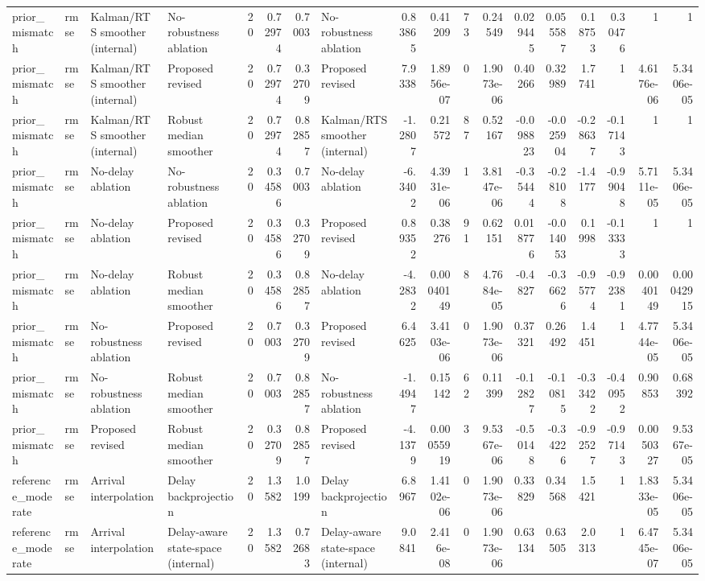 \begin{table}[!htbp]
{\begin{tabular}{llllrrrlrrrrrrrrrr}
prior_mismatch & rmse & Kalman/RTS smoother (internal) & No-robustness ablation & 20 & 0.72974 & 0.7003 & No-robustness ablation & 0.83865 & 0.41209 & 73 & 0.24549 & 0.029445 & 0.055587 & 0.18753 & 0.30476 & 1 & 1 \\
prior_mismatch & rmse & Kalman/RTS smoother (internal) & Proposed revised & 20 & 0.72974 & 0.32709 & Proposed revised & 7.9338 & 1.8956e-07 & 0 & 1.9073e-06 & 0.40266 & 0.32989 & 1.7741 & 1 & 4.6176e-06 & 5.3406e-05 \\
prior_mismatch & rmse & Kalman/RTS smoother (internal) & Robust median smoother & 20 & 0.72974 & 0.82857 & Kalman/RTS smoother (internal) & -1.2807 & 0.21572 & 87 & 0.52167 & -0.098823 & -0.025904 & -0.28637 & -0.17143 & 1 & 1 \\
prior_mismatch & rmse & No-delay ablation & No-robustness ablation & 20 & 0.34586 & 0.7003 & No-delay ablation & -6.3402 & 4.3931e-06 & 1 & 3.8147e-06 & -0.35444 & -0.28108 & -1.4177 & -0.99048 & 5.7111e-05 & 5.3406e-05 \\
prior_mismatch & rmse & No-delay ablation & Proposed revised & 20 & 0.34586 & 0.32709 & Proposed revised & 0.89352 & 0.38276 & 91 & 0.62151 & 0.018776 & -0.014053 & 0.1998 & -0.13333 & 1 & 1 \\
prior_mismatch & rmse & No-delay ablation & Robust median smoother & 20 & 0.34586 & 0.82857 & No-delay ablation & -4.2832 & 0.00040149 & 8 & 4.7684e-05 & -0.4827 & -0.36626 & -0.95774 & -0.92381 & 0.0040149 & 0.00042915 \\
prior_mismatch & rmse & No-robustness ablation & Proposed revised & 20 & 0.7003 & 0.32709 & Proposed revised & 6.4625 & 3.4103e-06 & 0 & 1.9073e-06 & 0.37321 & 0.26492 & 1.4451 & 1 & 4.7744e-05 & 5.3406e-05 \\
prior_mismatch & rmse & No-robustness ablation & Robust median smoother & 20 & 0.7003 & 0.82857 & No-robustness ablation & -1.4947 & 0.15142 & 62 & 0.11399 & -0.12827 & -0.10815 & -0.33422 & -0.40952 & 0.90853 & 0.68392 \\
prior_mismatch & rmse & Proposed revised & Robust median smoother & 20 & 0.32709 & 0.82857 & Proposed revised & -4.1379 & 0.00055919 & 3 & 9.5367e-06 & -0.50148 & -0.34226 & -0.92527 & -0.97143 & 0.0050327 & 9.5367e-05 \\
reference_moderate & rmse & Arrival interpolation & Delay backprojection & 20 & 1.3582 & 1.0199 & Delay backprojection & 6.8967 & 1.4102e-06 & 0 & 1.9073e-06 & 0.33829 & 0.34568 & 1.5421 & 1 & 1.8333e-05 & 5.3406e-05 \\
reference_moderate & rmse & Arrival interpolation & Delay-aware state-space (internal) & 20 & 1.3582 & 0.72683 & Delay-aware state-space (internal) & 9.0841 & 2.416e-08 & 0 & 1.9073e-06 & 0.63134 & 0.63505 & 2.0313 & 1 & 6.4745e-07 & 5.3406e-05 \\

\end{tabular}}
\end{table}
